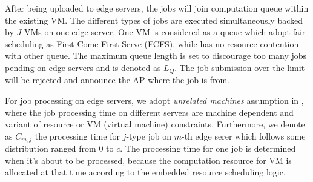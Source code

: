 After being uploaded to edge servers, the jobs will join computation queue within the existing VM.
The different types of jobs are executed simultaneously backed by $J$ VMs on one edge server.
One VM is considered as a queue which adopt fair scheduling as First-Come-First-Serve (FCFS), while has no resource contention with other queue.
The maximum queue length is set to discourage too many jobs pending on edge servers and is denoted as $L_Q$. The job submission over the limit will be rejected and announce the AP where the job is from.

For job processing on edge servers, we adopt \emph{unrelated machines} assumption in \cite{tan-online}, where the job processing time on different servers are machine dependent and variant of resource or VM (virtual machine) constraints.
Furthermore, we denote as $C_{m,j}$ the processing time for $j$-type job on $m$-th edge serer which follows some distribution ranged from $0$ to $c$.
The processing time for one job is determined when it's about to be processed, because the computation resource for VM is allocated at that time according to the embedded resource scheduling logic.


